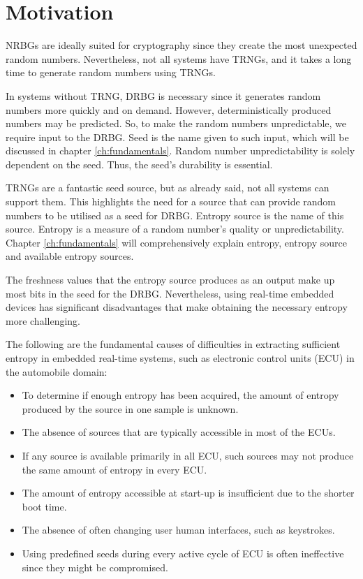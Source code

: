 %
%
\section{Motivation}
\label{sec:intro:structure}

NRBGs are ideally suited for cryptography since they create the most unexpected random numbers. Nevertheless, not all systems have TRNGs, and it takes a long time to generate random numbers using TRNGs.

In systems without TRNG, DRBG is necessary since it generates random numbers more quickly and on demand. However, deterministically produced numbers may be predicted. So, to make the random numbers unpredictable, we require input to the DRBG. Seed is the name given to such input, which will be discussed in chapter \ref{ch:fundamentals}. Random number unpredictability is solely dependent on the seed.
Thus, the seed’s durability is essential.

TRNGs are a fantastic seed source, but as already said, not all systems can support them. This highlights the need for a source that can provide random numbers to be utilised as a seed for DRBG. Entropy source is the name of this source. Entropy is a measure of a random number’s quality or unpredictability. Chapter \ref{ch:fundamentals} will comprehensively explain entropy, entropy source and available entropy sources.

The freshness values that the entropy source produces as an output make up most bits in the seed for the DRBG. Nevertheless, using real-time embedded devices has significant disadvantages that make obtaining the necessary entropy more challenging.

The following are the fundamental causes of difficulties in extracting sufficient entropy in embedded real-time systems, such as electronic control units (ECU) in the automobile domain:

\begin{itemize}
	\item To determine if enough entropy has been acquired, the amount of entropy produced by the source in one sample is unknown.
	\item The absence of sources that are typically accessible in most of the ECUs.
	\item If any source is available primarily in all ECU, such sources may not produce the same amount of entropy in every ECU.	
	\item The amount of entropy accessible at start-up is insufficient due to the shorter boot time.	
	\item The absence of often changing user human interfaces, such as keystrokes.	
	\item Using predefined seeds during every active cycle of ECU is often ineffective since they might be compromised. 
\end{itemize}

